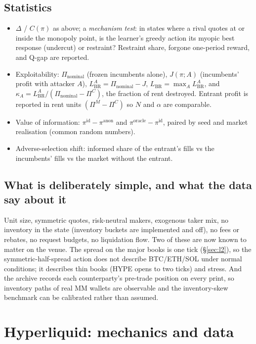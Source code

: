 \documentclass[11pt]{article}
\begin{document}
\subsection{Statistics}
\begin{itemize}
\item $\Delta$ / $C(\pi)$ as above; a \emph{mechanism test}: in states where a rival quotes at or inside the monopoly point, is the learner's greedy action its myopic best response (undercut) or restraint? Restraint share, forgone one-period reward, and Q-gap are reported.
\item Exploitability: $\Pi_{\mathrm{nominal}}$ (frozen incumbents alone), $J(\pi;A)$ (incumbents' profit with attacker $A$), $L^A_{\mathrm{BR}}=\Pi_{\mathrm{nominal}}-J$, $L_{\mathrm{BR}}=\max_A L^A_{\mathrm{BR}}$, and $\kappa_A=L^A_{\mathrm{BR}}/(\Pi_{\mathrm{nominal}}-\Pi^C)$, the fraction of rent destroyed. Entrant profit is reported in rent units $(\Pi^M-\Pi^C)$ so $N$ and $\alpha$ are comparable.
\item Value of information: $\pi^{\mathrm{id}}-\pi^{\mathrm{anon}}$ and $\pi^{\mathrm{oracle}}-\pi^{\mathrm{id}}$, paired by seed and market realisation (common random numbers).
\item Adverse-selection shift: informed share of the entrant's fills vs the incumbents' fills vs the market without the entrant.
\end{itemize}

\subsection{What is deliberately simple, and what the data say about it}
Unit size, symmetric quotes, risk-neutral makers, exogenous taker mix, no inventory in the state (inventory buckets are implemented and off), no fees or rebates, no request budgets, no liquidation flow. Two of these are now known to matter on the venue. The spread on the major books is one tick (\S\ref{sec:l2}), so the symmetric-half-spread action does not describe BTC/ETH/SOL under normal conditions; it describes thin books (HYPE opens to two ticks) and stress. And the archive records each counterparty's pre-trade position on every print, so inventory paths of real MM wallets are observable and the inventory-skew benchmark can be calibrated rather than assumed.

\section{Hyperliquid: mechanics and data}\label{sec:hl}
\end{document}
